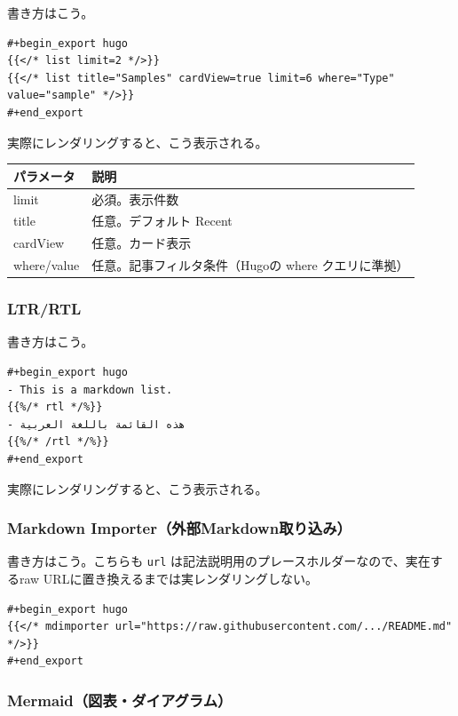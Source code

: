 \documentclass[11pt]{article}
\begin{document}
書き方はこう。

\begin{verbatim}
#+begin_export hugo
{{</* list limit=2 */>}}
{{</* list title="Samples" cardView=true limit=6 where="Type" value="sample" */>}}
#+end_export
\end{verbatim}

実際にレンダリングすると、こう表示される。

\begin{center}
\begin{tabular}{ll}
パラメータ & 説明\\
\hline
limit & 必須。表示件数\\
title & 任意。デフォルト Recent\\
cardView & 任意。カード表示\\
where/value & 任意。記事フィルタ条件（Hugoの where クエリに準拠）\\
\end{tabular}
\end{center}
\subsubsection{LTR/RTL}
\label{sec:org17bc894}

書き方はこう。

\begin{verbatim}
#+begin_export hugo
- This is a markdown list.
{{%/* rtl */%}}
- هذه القائمة باللغة العربية
{{%/* /rtl */%}}
#+end_export
\end{verbatim}

実際にレンダリングすると、こう表示される。
\subsubsection{Markdown Importer（外部Markdown取り込み）}
\label{sec:org6e09746}

書き方はこう。こちらも \texttt{url} は記法説明用のプレースホルダーなので、実在するraw URLに置き換えるまでは実レンダリングしない。

\begin{verbatim}
#+begin_export hugo
{{</* mdimporter url="https://raw.githubusercontent.com/.../README.md" */>}}
#+end_export
\end{verbatim}
\subsubsection{Mermaid（図表・ダイアグラム）}
\label{sec:orgf22a273}
\end{document}
